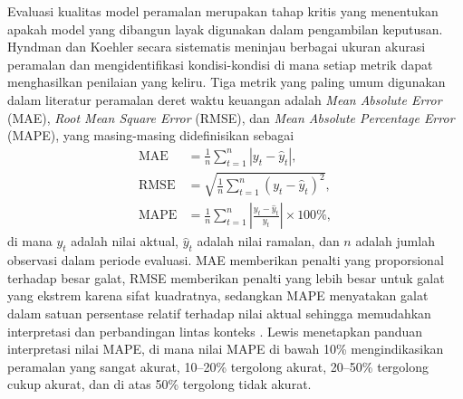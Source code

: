\documentclass[11pt,twoside]{article}
\begin{document}
Evaluasi kualitas model peramalan merupakan tahap kritis yang menentukan apakah model
yang dibangun layak digunakan dalam pengambilan keputusan. Hyndman dan Koehler
\cite{Hyndman2006} secara sistematis meninjau berbagai ukuran akurasi peramalan dan
mengidentifikasi kondisi-kondisi di mana setiap metrik dapat menghasilkan penilaian yang
keliru. Tiga metrik yang paling umum digunakan dalam literatur peramalan deret waktu
keuangan adalah \textit{Mean Absolute Error} (MAE), \textit{Root Mean Square Error}
(RMSE), dan \textit{Mean Absolute Percentage Error} (MAPE), yang masing-masing
didefinisikan sebagai
\begin{align}
    \text{MAE}  &= \frac{1}{n}\sum_{t=1}^{n} |y_t - \hat{y}_t|, \label{Eq:MAE} \\[4pt]
    \text{RMSE} &= \sqrt{\frac{1}{n}\sum_{t=1}^{n}(y_t - \hat{y}_t)^2}, \label{Eq:RMSE} \\[4pt]
    \text{MAPE} &= \frac{1}{n}\sum_{t=1}^{n}\left|\frac{y_t - \hat{y}_t}{y_t}\right|\times 100\%, \label{Eq:MAPE}
\end{align}
di mana $y_t$ adalah nilai aktual, $\hat{y}_t$ adalah nilai ramalan, dan $n$ adalah jumlah
observasi dalam periode evaluasi. MAE memberikan penalti yang proporsional terhadap
besar galat, RMSE memberikan penalti yang lebih besar untuk galat yang ekstrem karena
sifat kuadratnya, sedangkan MAPE menyatakan galat dalam satuan persentase relatif
terhadap nilai aktual sehingga memudahkan interpretasi dan perbandingan lintas konteks
\cite{Hyndman2006}. Lewis \cite{Lewis1982} menetapkan panduan interpretasi nilai MAPE, di mana
nilai MAPE di bawah 10\% mengindikasikan peramalan yang sangat akurat, 10--20\%
tergolong akurat, 20--50\% tergolong cukup akurat, dan di atas 50\% tergolong tidak akurat.

%

\printbibliography
\end{document}
